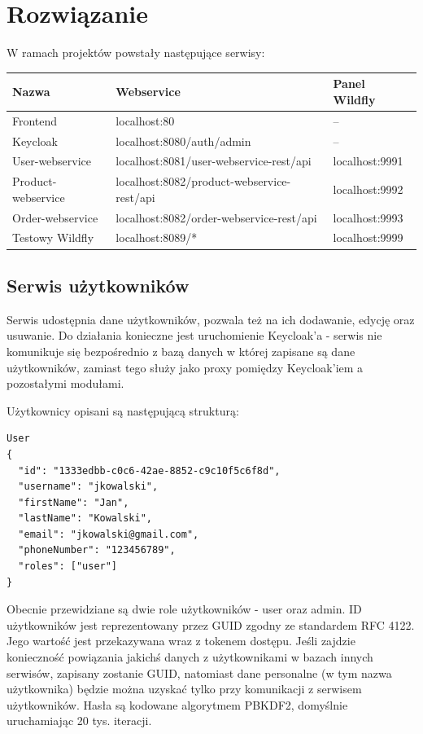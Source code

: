 \documentclass[11pt,a4paper,twoside]{article}
\begin{document}
\section{Rozwiązanie}
W ramach projektów powstały następujące serwisy:

\begin{table}[ht]
\label{spisSerwisow}
\centering
\begin{tabular}{|l|l|l|}
\hline
 Nazwa & Webservice & Panel Wildfly \\\hline
 Frontend & localhost:80 & -- \\\hline
 Keycloak & localhost:8080/auth/admin & -- \\\hline
 User-webservice & localhost:8081/user-webservice-rest/api & localhost:9991 \\\hline
 Product-webservice & localhost:8082/product-webservice-rest/api & localhost:9992 \\\hline
 Order-webservice & localhost:8082/order-webservice-rest/api & localhost:9993\\\hline
 Testowy Wildfly & localhost:8089/* & localhost:9999 \\\hline
\end{tabular}
\end{table}

\subsection{Serwis użytkowników}
Serwis udostępnia dane użytkowników, pozwala też na ich dodawanie, edycję oraz usuwanie. Do działania konieczne jest uruchomienie Keycloak'a  - serwis nie komunikuje się bezpośrednio z bazą danych w której zapisane są dane użytkowników, zamiast tego służy jako proxy pomiędzy Keycloak'iem a pozostałymi modułami.

Użytkownicy opisani są następującą strukturą:

\begin{lstlisting}
User
{
  "id": "1333edbb-c0c6-42ae-8852-c9c10f5c6f8d",
  "username": "jkowalski",
  "firstName": "Jan",
  "lastName": "Kowalski",
  "email": "jkowalski@gmail.com",
  "phoneNumber": "123456789",
  "roles": ["user"]
}
\end{lstlisting}
\vspace{-20pt}
Obecnie przewidziane są dwie role użytkowników - user oraz admin. ID użytkowników jest reprezentowany przez GUID zgodny ze standardem RFC 4122. Jego wartość jest przekazywana wraz z tokenem dostępu. Jeśli zajdzie konieczność powiązania jakichś danych z użytkownikami w bazach innych serwisów, zapisany zostanie GUID, natomiast dane personalne (w tym nazwa użytkownika) będzie można uzyskać tylko przy komunikacji z serwisem użytkowników. Hasła są kodowane algorytmem PBKDF2, domyślnie uruchamiając 20 tys. iteracji.
\end{document}
